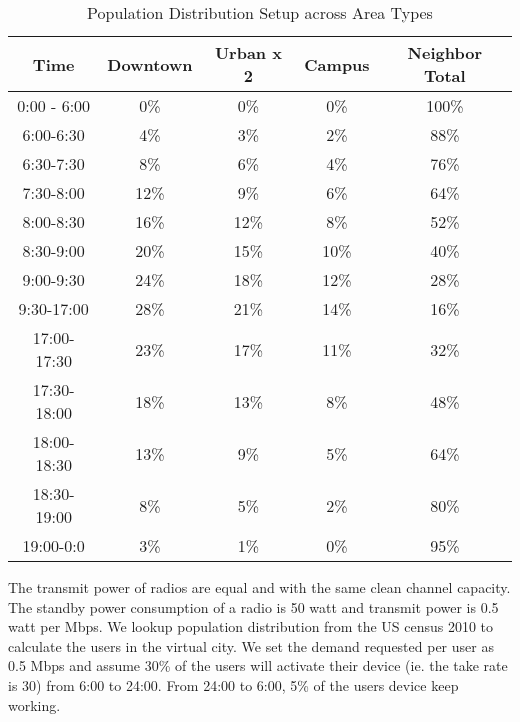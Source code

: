 \begin{table}
\centering
\begin{tabular}{ | c | c | c | c |c|}
\hline
Time & Downtown& Urban x 2 & Campus & Neighbor Total \\
\hline %
0:00 - 6:00  & 0\% & 0\% & 0\% & 100\%   \\
\hline %
6:00-6:30  & 4\% & 3\%  & 2\%  & 88\%  \\
\hline %
6:30-7:30  & 8\% & 6\%  & 4\%  & 76\%  \\ 
\hline %
7:30-8:00  & 12\% & 9\%  & 6\%  & 64\%   \\
\hline %
8:00-8:30  & 16\% & 12\%  & 8\%  & 52\%  \\
\hline %
8:30-9:00  & 20\% & 15\%  & 10\%  & 40\%  \\
\hline %
9:00-9:30  & 24\% & 18\%  & 12\%  & 28\%  \\
\hline %
9:30-17:00  & 28\% & 21\%  & 14\%  & 16\%  \\
\hline %
17:00-17:30  & 23\% & 17\%  & 11\%  & 32\%  \\
\hline %
17:30-18:00  & 18\% & 13\%  & 8\%  & 48\%  \\
\hline %
18:00-18:30  & 13\% & 9\%  & 5\%  & 64\% \\
\hline %
18:30-19:00  & 8\% & 5\%  & 2\%  & 80\% \\
\hline %
19:00-0:0  & 3\% & 1\%  & 0\%  & 95\%  \\
\hline %
\end{tabular}
\label{tab:populationsetup}    
\caption{Population Distribution Setup across Area Types} %
\end{table}




The transmit power of radios are equal and with the same clean channel capacity. 
The standby power consumption of a radio is 50 watt and transmit power is 0.5 watt per Mbps.
We lookup population distribution from the US census 2010 to calculate the users in the 
virtual city. We set the demand requested per user as 0.5 Mbps and assume 30\% of the users will 
activate their device (ie. the take rate is 30) from 6:00 to 24:00. From 24:00 to 6:00, 5\% of 
the users device keep working. 



